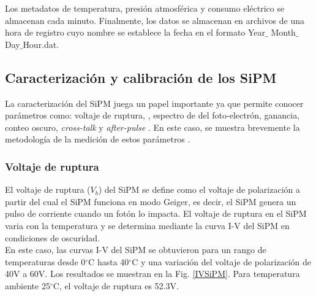 Los metadatos de temperatura, presión atmosférica y consumo eléctrico se almacenan cada minuto. Finalmente, los datos se almacenan en archivos de una hora de registro cuyo nombre se establece la fecha en el formato Year$\_$ Month$\_$Day$\_$Hour.dat.


\subsection{Caracterización y calibración de los SiPM}

La caracterización del SiPM juega un papel importante ya que permite conocer parámetros como: voltaje de ruptura, , espectro de del foto-electrón, ganancia, conteo oscuro, \textit{cross-talk} y \textit{after-pulse} \cite{sensL2011}. En este caso, se muestra brevemente la metodología de la medición de estos parámetros . 

\subsubsection{Voltaje de ruptura}

El voltaje de ruptura ($V_b$) del SiPM se define como el voltaje de polarización a partir del cual el SiPM funciona en modo Geiger, es decir, el SiPM genera un pulso de corriente cuando un fotón lo impacta. El voltaje de ruptura en el SiPM varia con la temperatura y se determina mediante la curva I-V del SiPM en condiciones de oscuridad.\\

En este caso, las curvas I-V del SiPM se obtuvieron para un rango de temperaturas desde 0$^{\circ}$C hasta 40$^{\circ}$C y una variación del voltaje de polarización de 40V a 60V. Los resultados se muestran en la Fig. \ref{IVSiPM}. Para temperatura ambiente 25$^{\circ}$C, el voltaje de ruptura es 52.3V.

